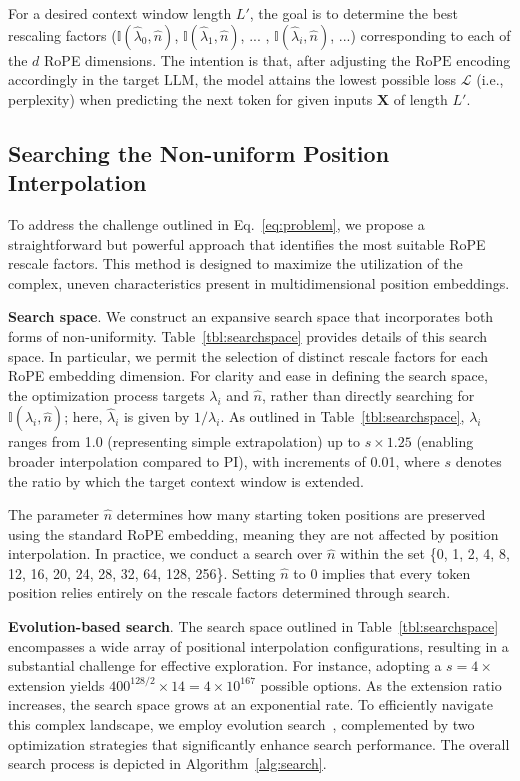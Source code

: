 For a desired context window length $L'$, the goal is to determine the best rescaling factors ($\mathbb{I}(\hat{\lambda}_{0},\hat{n})$, $\mathbb{I}(\hat{\lambda}_{1},\hat{n})$, ... , $\mathbb{I}(\hat{\lambda}_{i},\hat{n})$, ...) corresponding to each of the $d$ RoPE dimensions. The intention is that, after adjusting the $\text{RoPE}$ encoding accordingly in the target $\text{LLM}$, the model attains the lowest possible loss $\mathcal{L}$ (i.e., perplexity) when predicting the next token for given inputs $\mathbf{X}$ of length $L'$.

\subsection{Searching the Non-uniform Position Interpolation}

To address the challenge outlined in Eq.~\ref{eq:problem}, we propose a straightforward but powerful approach that identifies the most suitable RoPE rescale factors. This method is designed to maximize the utilization of the complex, uneven characteristics present in multidimensional position embeddings.

\textbf{Search space}. We construct an expansive search space that incorporates both forms of non-uniformity. Table~\ref{tbl:searchspace} provides details of this search space. In particular, we permit the selection of distinct rescale factors for each RoPE embedding dimension. For clarity and ease in defining the search space, the optimization process targets $\lambda_i$ and $\hat{n}$, rather than directly searching for $\mathbb{I}(\hat{\lambda}_i, \hat{n})$; here, $\hat{\lambda}_i$ is given by $1/\lambda_i$. As outlined in Table~\ref{tbl:searchspace}, $\lambda_i$ ranges from 1.0 (representing simple extrapolation) up to $s \times 1.25$ (enabling broader interpolation compared to PI), with increments of 0.01, where $s$ denotes the ratio by which the target context window is extended.

The parameter $\hat{n}$ determines how many starting token positions are preserved using the standard RoPE embedding, meaning they are not affected by position interpolation. In practice, we conduct a search over $\hat{n}$ within the set \{0, 1, 2, 4, 8, 12, 16, 20, 24, 28, 32, 64, 128, 256\}. Setting $\hat{n}$ to 0 implies that every token position relies entirely on the rescale factors determined through search.

\textbf{Evolution-based search}. The search space outlined in Table~\ref{tbl:searchspace} encompasses a wide array of positional interpolation configurations, resulting in a substantial challenge for effective exploration. For instance, adopting a $s=4\times$ extension yields $400^{128/2}\times14=4\times10^{167}$ possible options. As the extension ratio increases, the search space grows at an exponential rate. To efficiently navigate this complex landscape, we employ evolution search~\cite{guo2020single}, complemented by two optimization strategies that significantly enhance search performance. The overall search process is depicted in Algorithm~\ref{alg:search}.

